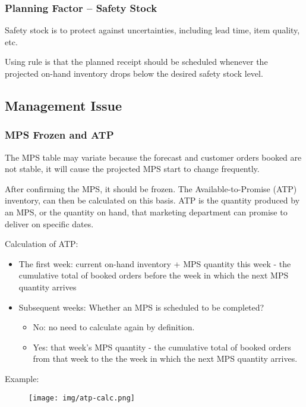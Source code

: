 \documentclass{article}
\begin{document}
\subsubsection{Planning Factor -- Safety Stock}

Safety stock is to protect against uncertainties, including lead time,
item quality, etc.

Using rule is that the planned receipt should be scheduled whenever the projected on-hand inventory
drops below the desired safety stock level.

\subsection{Management Issue}

\subsubsection{MPS Frozen and ATP}

The MPS table may variate because the forecast and customer orders booked are not stable,
it will cause the projected MPS start to change frequently.

After confirming the MPS, it should be frozen.
The Available-to-Promise (ATP) inventory,
can then be calculated on this basis.
ATP is the quantity produced by an MPS, or the quantity on hand,
that marketing department can promise to deliver on specific dates.

Calculation of ATP:
\begin{itemize}
	\item The first week: current on-hand inventory + MPS quantity this week -
					the cumulative total of booked orders before the week in which the next MPS quantity arrives
  \item Subsequent weeks: Whether an MPS is scheduled to be completed?
	\begin{itemize}
		\item No: no need to calculate again by definition.
		\item Yes: that week's MPS quantity - the cumulative total of booked orders from that week
						to the the week in which the next MPS quantity arrives.
	\end{itemize}
\end{itemize}

Example:
\begin{figure}[H]
	\centering
	\texttt{[image: img/atp-calc.png]}
\end{figure}
\end{document}
